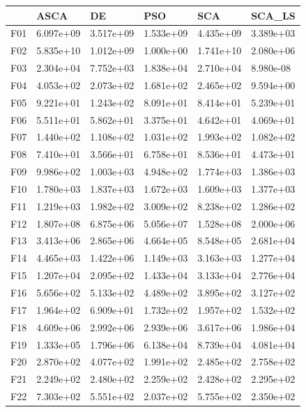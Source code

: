 \begin{tabular}{llllll}
\toprule
{} &       ASCA &         DE &        PSO &        SCA &     SCA\_LS \\
\midrule
F01  &  6.097e+09 &  3.517e+09 &  1.533e+09 &  4.435e+09 &  3.389e+03 \\
F02  &  5.835e+10 &  1.012e+09 &  1.000e+00 &  1.741e+10 &  2.080e+06 \\
F03  &  2.304e+04 &  7.752e+03 &  1.838e+04 &  2.710e+04 &  8.980e-08 \\
F04  &  4.053e+02 &  2.073e+02 &  1.681e+02 &  2.465e+02 &  9.594e+00 \\
F05  &  9.221e+01 &  1.243e+02 &  8.091e+01 &  8.414e+01 &  5.239e+01 \\
F06  &  5.511e+01 &  5.862e+01 &  3.375e+01 &  4.642e+01 &  4.069e+01 \\
F07  &  1.440e+02 &  1.108e+02 &  1.031e+02 &  1.993e+02 &  1.082e+02 \\
F08  &  7.410e+01 &  3.566e+01 &  6.758e+01 &  8.536e+01 &  4.473e+01 \\
F09  &  9.986e+02 &  1.003e+03 &  4.948e+02 &  1.774e+03 &  1.386e+03 \\
F10  &  1.780e+03 &  1.837e+03 &  1.672e+03 &  1.609e+03 &  1.377e+03 \\
F11  &  1.219e+03 &  1.982e+02 &  3.009e+02 &  8.238e+02 &  1.286e+02 \\
F12  &  1.807e+08 &  6.875e+06 &  5.056e+07 &  1.528e+08 &  2.000e+06 \\
F13  &  3.413e+06 &  2.865e+06 &  4.664e+05 &  8.548e+05 &  2.681e+04 \\
F14  &  4.465e+03 &  1.422e+06 &  1.149e+03 &  3.163e+03 &  1.277e+04 \\
F15  &  1.207e+04 &  2.095e+02 &  1.433e+04 &  3.133e+04 &  2.776e+04 \\
F16  &  5.656e+02 &  5.133e+02 &  4.489e+02 &  3.895e+02 &  3.127e+02 \\
F17  &  1.964e+02 &  6.909e+01 &  1.732e+02 &  1.957e+02 &  1.532e+02 \\
F18  &  4.609e+06 &  2.992e+06 &  2.939e+06 &  3.617e+06 &  1.986e+04 \\
F19  &  1.333e+05 &  1.796e+06 &  6.138e+04 &  8.739e+04 &  4.081e+04 \\
F20  &  2.870e+02 &  4.077e+02 &  1.991e+02 &  2.485e+02 &  2.758e+02 \\
F21  &  2.249e+02 &  2.480e+02 &  2.259e+02 &  2.428e+02 &  2.295e+02 \\
F22  &  7.303e+02 &  5.551e+02 &  2.037e+02 &  5.755e+02 &  2.350e+02 \\

\end{tabular}
